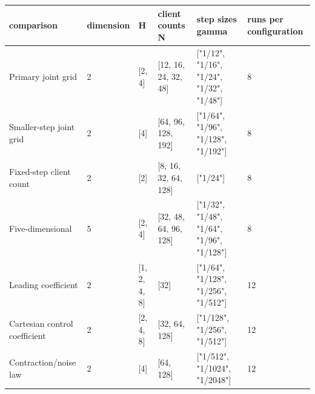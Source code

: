 \begin{tabular}{llllll}
comparison & dimension & H & client counts N & step sizes gamma & runs per configuration \\
\hline
Primary joint grid & 2 & [2, 4] & [12, 16, 24, 32, 48] & ["1/12", "1/16", "1/24", "1/32", "1/48"] & 8 \\
Smaller-step joint grid & 2 & [4] & [64, 96, 128, 192] & ["1/64", "1/96", "1/128", "1/192"] & 8 \\
Fixed-step client count & 2 & [2] & [8, 16, 32, 64, 128] & ["1/24"] & 8 \\
Five-dimensional & 5 & [2, 4] & [32, 48, 64, 96, 128] & ["1/32", "1/48", "1/64", "1/96", "1/128"] & 8 \\
Leading coefficient & 2 & [1, 2, 4, 8] & [32] & ["1/64", "1/128", "1/256", "1/512"] & 12 \\
Cartesian control coefficient & 2 & [2, 4, 8] & [32, 64, 128] & ["1/128", "1/256", "1/512"] & 12 \\
Contraction/noise law & 2 & [4] & [64, 128] & ["1/512", "1/1024", "1/2048"] & 12 \\
\end{tabular}
